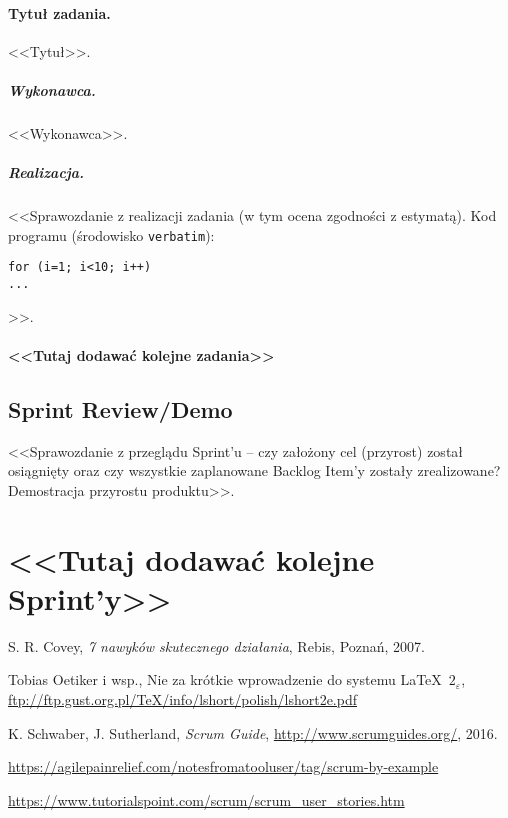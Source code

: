 \documentclass[a4paper]{article}
\begin{document}
\paragraph{Tytuł zadania.} <<Tytuł>>.
\subparagraph{Wykonawca.} <<Wykonawca>>.
\subparagraph{Realizacja.} <<Sprawozdanie z realizacji zadania (w tym ocena zgodności z estymatą). Kod programu (środowisko \texttt{verbatim}): \begin{verbatim}
for (i=1; i<10; i++)
...
\end{verbatim}>>.

\paragraph{<<Tutaj dodawać kolejne zadania>>}


\subsection{Sprint Review/Demo}
<<Sprawozdanie z przeglądu Sprint'u -- czy założony cel (przyrost) został osiągnięty oraz czy wszystkie zaplanowane Backlog Item'y zostały zrealizowane? Demostracja przyrostu produktu>>.

\section*{<<Tutaj dodawać kolejne Sprint'y>>}


\begin{thebibliography}{9}

 S. R. Covey, {\em 7 nawyków skutecznego działania}, Rebis, Poznań, 2007.

 Tobias Oetiker i wsp., Nie za krótkie wprowadzenie do systemu \LaTeX  \ $2_\varepsilon$, \url{ftp://ftp.gust.org.pl/TeX/info/lshort/polish/lshort2e.pdf}

 K. Schwaber, J. Sutherland, {\em Scrum Guide}, \url{http://www.scrumguides.org/}, 2016.

 \url{https://agilepainrelief.com/notesfromatooluser/tag/scrum-by-example}

 \url{https://www.tutorialspoint.com/scrum/scrum_user_stories.htm}

\end{thebibliography}
\end{document}
